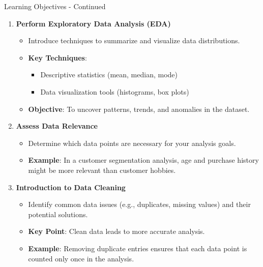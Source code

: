 \documentclass[aspectratio=169]{beamer}
\begin{document}
\begin{frame}[fragile]{Learning Objectives - Continued}
    \begin{enumerate}[resume]
        \item \textbf{Perform Exploratory Data Analysis (EDA)}  
            \begin{itemize}
                \item Introduce techniques to summarize and visualize data distributions.
                \item \textbf{Key Techniques}: 
                    \begin{itemize}
                        \item Descriptive statistics (mean, median, mode)
                        \item Data visualization tools (histograms, box plots)
                    \end{itemize}
                \item \textbf{Objective}: To uncover patterns, trends, and anomalies in the dataset.
            \end{itemize}

        \item \textbf{Assess Data Relevance}  
            \begin{itemize}
                \item Determine which data points are necessary for your analysis goals.
                \item \textbf{Example}: In a customer segmentation analysis, age and purchase history might be more relevant than customer hobbies.
            \end{itemize}

        \item \textbf{Introduction to Data Cleaning}  
            \begin{itemize}
                \item Identify common data issues (e.g., duplicates, missing values) and their potential solutions.
                \item \textbf{Key Point}: Clean data leads to more accurate analysis.
                \item \textbf{Example}: Removing duplicate entries ensures that each data point is counted only once in the analysis.
            \end{itemize}
    \end{enumerate}
\end{frame}
\end{document}
